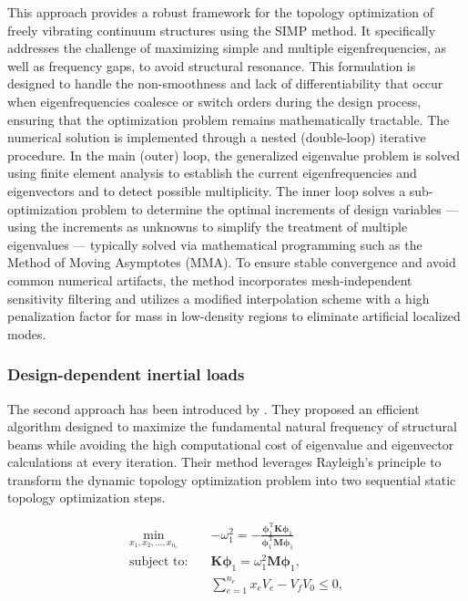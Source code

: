 \documentclass[pdflatex,lineno,sn-mathphys-ay]{sn-jnl}
\begin{document}
This approach provides a robust framework for the topology optimization of freely vibrating continuum structures using the SIMP method. It specifically addresses the challenge of maximizing simple and multiple eigenfrequencies, as well as frequency gaps, to avoid structural resonance. 
This formulation is designed to handle the non-smoothness and lack of differentiability that occur when eigenfrequencies coalesce or switch orders during the design process, ensuring that the optimization problem remains mathematically tractable.
The numerical solution is implemented through a nested (double-loop) iterative procedure. In the main (outer) loop, the generalized eigenvalue problem is solved using finite element analysis to establish the current eigenfrequencies and eigenvectors and to detect possible multiplicity. The inner loop solves a sub-optimization problem to determine the optimal increments of design variables — using the increments as unknowns to simplify the treatment of multiple eigenvalues — typically solved via mathematical programming such as the Method of Moving Asymptotes (MMA). To ensure stable convergence and avoid common numerical artifacts, the method incorporates mesh-independent sensitivity filtering and utilizes a modified interpolation scheme with a high penalization factor for mass in low-density regions to eliminate artificial localized modes.

\subsubsection{Design-dependent inertial loads}

The second approach has been introduced by \citet{Yuksel2025}. They proposed an efficient algorithm designed to maximize the fundamental natural frequency of structural beams while avoiding the high computational cost of eigenvalue and eigenvector calculations at every iteration. Their method leverages Rayleigh’s principle to transform the dynamic topology optimization problem into two sequential static topology optimization steps. 

\begin{align*}
\min_{x_1,x_2,\dots,x_{n_e}} \quad & -\omega_1^2 = -\frac{\boldsymbol{\phi}_1^{\mathrm{T}} \mathbf{K} \boldsymbol{\phi}_1}{\boldsymbol{\phi}_1^{\mathrm{T}} \mathbf{M} \boldsymbol{\phi}_1} \\[8pt]
\text{subject to:} \quad & \mathbf{K}\boldsymbol{\phi}_1 = \omega_1^2 \mathbf{M}\boldsymbol{\phi}_1, \\[4pt]
& \sum_{e=1}^{n_e} x_e V_e - V_f V_0 \le 0,
\end{align*}
\end{document}
